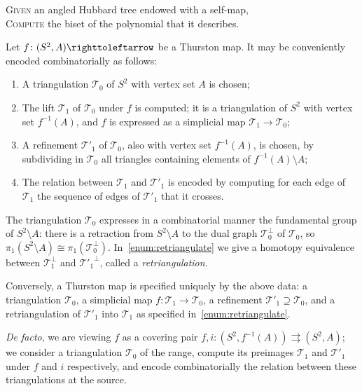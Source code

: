 \documentclass{amsart}
\begin{document}
\begin{algo}\label{algo:hubbardtree2biset}
  \textsc{Given} an angled Hubbard tree endowed with a self-map,\\
  \textsc{Compute} the biset of the polynomial that it describes.
\end{algo}

Let $f\colon (S^2,A)\selfmap$ be a Thurston map. It may be
conveniently encoded combinatorially as follows:
\begin{enumerate}
\item A triangulation $\mathcal T_0$ of $S^2$ with vertex set $A$ is chosen;
\item The lift $\mathcal T_1$ of $\mathcal T_0$ under $f$ is computed;
  it is a triangulation of $S^2$ with vertex set $f^{-1}(A)$, and $f$
  is expressed as a simplicial map $\mathcal T_1\to\mathcal T_0$;
\item A refinement $\mathcal T'_1$ of $\mathcal T_0$, also with vertex
  set $f^{-1}(A)$, is chosen, by subdividing in $\mathcal T_0$ all
  triangles containing elements of $f^{-1}(A)\setminus A$;
\item The relation between $\mathcal T_1$ and $\mathcal T'_1$ is
  encoded by computing for each edge of $\mathcal T_1$ the sequence of
  edges of $\mathcal T'_1$ that it crosses.\label{enum:retriangulate}
\end{enumerate}

The triangulation $\mathcal T_0$ expresses in a combinatorial manner
the fundamental group of $S^2\setminus A$: there is a retraction from
$S^2\setminus A$ to the dual graph $\mathcal T_0^\perp$ of
$\mathcal T_0$, so
$\pi_1(S^2\setminus A)\cong\pi_1(\mathcal
T_0^\perp)$. In~\eqref{enum:retriangulate} we give a homotopy
equivalence between $\mathcal T_1^\perp$ and ${\mathcal T'_1}^\perp$,
called a \emph{retriangulation}.

Conversely, a Thurston map is specified uniquely by the above data: a
triangulation $\mathcal T_0$, a simplicial map
$f\colon\mathcal T_1\to\mathcal T_0$, a refinement
$\mathcal T'_1\supseteq\mathcal T_0$, and a retriangulation of
$\mathcal T'_1$ into $\mathcal T_1$ as specified
in~\eqref{enum:retriangulate}.

\emph{De facto}, we are viewing $f$ as a covering pair
$f,i\colon(S^2,f^{-1}(A))\rightrightarrows(S^2,A)$; we consider a
triangulation $\mathcal T_0$ of the range, compute its preimages
$\mathcal T_1$ and $\mathcal T'_1$ under $f$ and $i$ respectively, and
encode combinatorially the relation between these triangulations at
the source.
\end{document}
